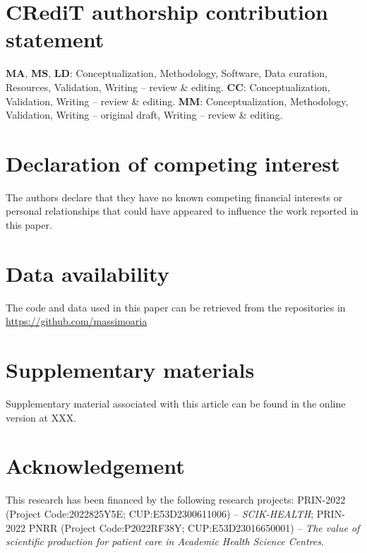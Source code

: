 \documentclass[preprint,12pt,a4paper]{elsarticle}
\begin{document}
\footnotesize{
\section*{CRediT authorship contribution statement}
\textbf{MA}, \textbf{MS}, \textbf{LD}: Conceptualization, Methodology, Software, Data curation, Resources, Validation, Writing -- review \& editing. \textbf{CC}: Conceptualization, Validation, Writing -- review \& editing. \textbf{MM}: Conceptualization, Methodology, Validation, Writing -- original draft, Writing -- review \& editing.

\section*{Declaration of competing interest}
The authors declare that they have no known competing financial interests or personal relationships that could have appeared to influence the work reported in this paper.

\section*{Data availability}
The code and data used in this paper can be retrieved from the repositories in \url{https://github.com/massimoaria}

\section*{Supplementary materials}
Supplementary material associated with this article can be found in the online version at XXX.

\section*{Acknowledgement}
This research has been financed by the following research projects: PRIN-2022  (Project Code:2022825Y5E; CUP:E53D2300611006) -- \textit{SCIK-HEALTH}; PRIN-2022 PNRR  (Project Code:P2022RF38Y; CUP:E53D23016650001) -- \textit{The value of scientific production for patient care in Academic Health Science Centres}.
}

\end{document}
